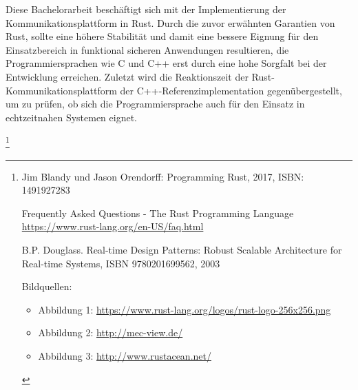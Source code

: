\begin{multicols}{2}
\vfill\null
\columnbreak

Diese Bachelorarbeit beschäftigt sich mit der Implementierung der Kommunikationsplattform in Rust.
Durch die zuvor erwähnten Garantien von Rust, sollte eine höhere Stabilität und damit eine bessere Eignung für den Einsatzbereich in funktional sicheren Anwendungen resultieren, die Programmiersprachen wie C und C++ erst durch eine hohe Sorgfalt bei der Entwicklung erreichen.
Zuletzt wird die Reaktionszeit der Rust-Kommunikationsplattform der C++-Referenzimplementation  gegenübergestellt, um zu prüfen, ob sich die Programmiersprache auch für den Einsatz in echtzeitnahen Systemen eignet.




\bildII

\end{multicols}
\def\footnoterule{} 
\let\thefootnote\relax\footnote{ 
	{ 
		\hspace{8.013cm}\vspace{0.1mm} 
		\begin{minipage}[t]{.5\linewidth}
			
\begin{list}{\textcolor{black}{[]}}{\setlength{\labelwidth}{2cm}\setlength{\leftmargin}{0.5cm}\setlength{\itemsep}{-1mm}}
	\item Jim Blandy und Jason Orendorff: Programming Rust, 2017, ISBN: 1491927283
	\item Frequently Asked Questions - The Rust Programming Language \url{https://www.rust-lang.org/en-US/faq.html}
	\item B.P. Douglass. Real-time Design Patterns: Robust Scalable Architecture for
	Real-time Systems, ISBN 9780201699562, 2003
\end{list}
Bildquellen:
\begin{itemize}
	\item Abbildung 1: \url{https://www.rust-lang.org/logos/rust-logo-256x256.png}
	\item Abbildung 2: \url{http://mec-view.de/}
	\item Abbildung 3: \url{http://www.rustacean.net/}
\end{itemize}

\end{minipage} 
}} 

\newpage

